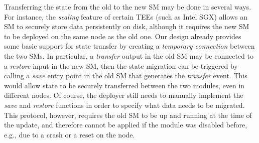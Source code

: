 Transferring the state from the old to the new \ac{SM} may be done in several
ways. For instance, the \emph{sealing} feature of certain \acp{TEE} (such as
Intel \ac{SGX}) allows an \ac{SM} to securely store data persistently on disk,
although it requires the new \ac{SM} to be deployed on the same node as the old
one. Our design already provides some basic support for state transfer by
creating a \emph{temporary connection} between the two \acp{SM}. In particular,
a \emph{transfer} output in the old \ac{SM} may be connected to a \emph{restore}
input in the new \ac{SM}, then the state migration can be triggered by calling a
\emph{save} entry point in the old \ac{SM} that generates the \emph{transfer}
event. This would allow state to be securely transferred between the two
modules, even in different nodes. Of course, the deployer still needs to
manually implement the \emph{save} and \emph{restore} functions in order to
specify what data needs to be migrated. This protocol, however, requires the old
\ac{SM} to be up and running at the time of the update, and therefore cannot be
applied if the module was disabled before, e.g., due to a crash or a reset on
the node.



